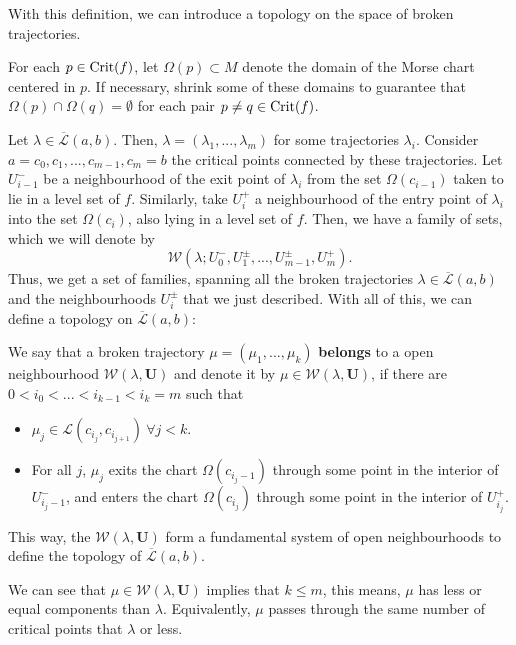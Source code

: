 With this definition, we can introduce a topology on the space of broken trajectories.

For each $p \in \text{Crit}(f)$, let $\Omega(p) \subset M$ denote the domain of the Morse chart centered in $p$. If necessary, shrink some of these domains to guarantee that $\Omega(p) \cap \Omega(q) = \emptyset$ for each pair $p \neq q \in \text{Crit}(f)$.

Let $\lambda \in \overline{\mathcal{L}}(a,b)$. Then, $\lambda = (\lambda_1,...,\lambda_m)$ for some trajectories $\lambda_i$. Consider $a = c_0, c_1, ..., c_{m-1}, c_m = b$ the critical points connected by these trajectories. Let $U_{i-1}^{-}$ be a neighbourhood of the exit point of $\lambda_i$ from the set $\Omega(c_{i-1})$ taken to lie in a level set of $f$. Similarly, take $U_i^+$ a neighbourhood of the entry point of $\lambda_i$ into the set $\Omega(c_i)$, also lying in a level set of $f$. Then, we have a family of sets, which we will denote by
$$\mathcal{W}(\lambda; U_0^{-}, U_1^{\pm},...,U_{m-1}^{\pm},U_m^{+}) .$$
Thus, we get a set of families, spanning all the broken trajectories $\lambda \in \overline{\mathcal{L}}(a,b)$ and the neighbourhoods $U_i^{\pm}$ that we just described. With all of this, we can define a topology on $\overline{\mathcal{L}}(a,b)$:

\begin{deff}
We say that a broken trajectory $\mu = (\mu_1,...,\mu_k)$ {\bf belongs} to a open neighbourhood $\mathcal{W}(\lambda,\mathbf{U})$ and denote it by $\mu \in \mathcal{W}(\lambda, \mathbf{U})$, if there are $0 < i_0 < ... < i_{k-1} < i_k = m$ such that

\begin{itemize}
	\item $\mu_j \in \mathcal{L}(c_{i_j},c_{i_{j+1}}) \ \forall j < k$.
	\item For all $j$, $\mu_j$ exits the chart $\Omega(c_{i_j-1})$ through some point in the interior of $U_{i_j-1}^{-}$, and enters the chart $\Omega(c_{i_j})$ through some point in the interior of $U_{i_j}^+$.
\end{itemize}

This way, the $\mathcal{W}(\lambda,\mathbf{U})$ form a fundamental system of open neighbourhoods to define the topology of $\overline{\mathcal{L}}(a,b)$.
\end{deff}

\begin{rmrk}
We can see that $\mu \in \mathcal{W}(\lambda, \mathbf{U})$ implies that $k \leq m$, this means, $\mu$ has less or equal components than $\lambda$. Equivalently, $\mu$ passes through the same number of critical points that $\lambda$ or less.
\end{rmrk}

